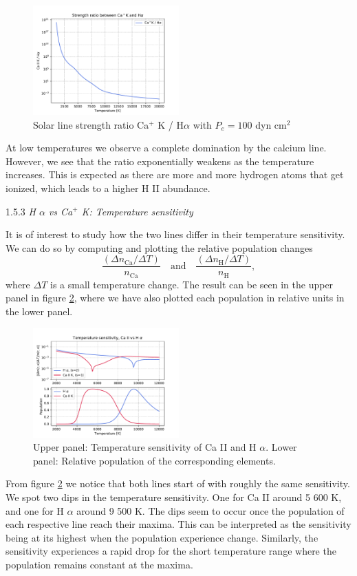 \documentclass[a4paper,11.5pt,]{article}
\begin{document}
\begin{multicols}{2}
\begin{figure}[H]
	\centering
	\includegraphics[width=0.5\textwidth]{SSA/figures/strengthratio.pdf}
	\caption{Solar line strength ratio Ca$^+$ K / H$\alpha$ with $P_e = 100$ dyn cm$^2$ }
	\label{fig:9}
\end{figure}

\noindent At low temperatures we observe a complete domination by the calcium line. However, we see that the ratio exponentially weakens as the temperature increases. This is expected as there are more and more hydrogen atoms that get ionized, which leads to a higher H II abundance. 

\begin{center}
1.5.3\textit{ H $\alpha$ vs Ca$^+$ K: Temperature sensitivity}
\end{center}
It is of interest to study how the two lines differ in their temperature sensitivity. We can do so by computing and plotting the relative population changes 
\[
\frac{(\Delta n_\text{Ca}/\Delta T)}{n_\text{Ca}} \quad \text{and} \quad \frac{(\Delta n_\text{H}/\Delta T)}{n_\text{H}},
\]
where $\Delta T$ is a small temperature change. The result can be seen in the upper panel in figure \ref{fig:10}, where we have also plotted each population in relative units in the lower panel.

\begin{figure}[H]
	\centering
	\includegraphics[width=0.5\textwidth]{SSA/figures/tempsens.pdf}
	\caption{Upper panel: Temperature sensitivity of Ca II and H $\alpha$. Lower panel: Relative population of the corresponding elements.}
	\label{fig:10}
\end{figure}
From figure \ref{fig:10} we notice that both lines start of with roughly the same sensitivity. We spot two dips in the temperature sensitivity. One for Ca II around 5 600 K, and one for H $\alpha$ around 9 500 K. The dips seem to occur once the population of each respective line reach their maxima. This can be interpreted as the sensitivity being at its highest when the population experience change. Similarly, the sensitivity experiences a rapid drop for the short temperature range where the population remains constant at the maxima.


\end{multicols}
\end{document}
